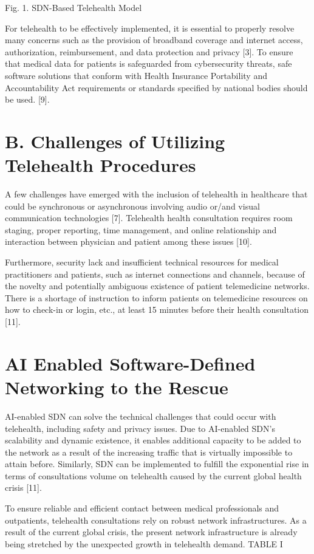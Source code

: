 \documentclass[10pt]{article}
\begin{document}
Fig. 1. SDN-Based Telehealth Model

For telehealth to be effectively implemented, it is essential to properly resolve many concerns such as the provision of broadband coverage and internet access, authorization, reimbursement, and data protection and privacy [3]. To ensure that medical data for patients is safeguarded from cybersecurity threats, safe software solutions that conform with Health Insurance Portability and Accountability Act requirements or standards specified by national bodies should be used. [9].

\section{B. Challenges of Utilizing Telehealth Procedures}
A few challenges have emerged with the inclusion of telehealth in healthcare that could be synchronous or asynchronous involving audio or/and visual communication technologies [7]. Telehealth health consultation requires room staging, proper reporting, time management, and online relationship and interaction between physician and patient among these issues [10].

Furthermore, security lack and insufficient technical resources for medical practitioners and patients, such as internet connections and channels, because of the novelty and potentially ambiguous existence of patient telemedicine networks. There is a shortage of instruction to inform patients on telemedicine resources on how to check-in or login, etc., at least 15 minutes before their health consultation [11].

\section{AI Enabled Software-Defined Networking to the Rescue}
AI-enabled SDN can solve the technical challenges that could occur with telehealth, including safety and privacy issues. Due to AI-enabled SDN's scalability and dynamic existence, it enables additional capacity to be added to the network as a result of the increasing traffic that is virtually impossible to attain before. Similarly, SDN can be implemented to fulfill the exponential rise in terms of consultations volume on telehealth caused by the current global health crisis [11].

To ensure reliable and efficient contact between medical professionals and outpatients, telehealth consultations rely on robust network infrastructures. As a result of the current global crisis, the present network infrastructure is already being stretched by the unexpected growth in telehealth demand. TABLE I
\end{document}
